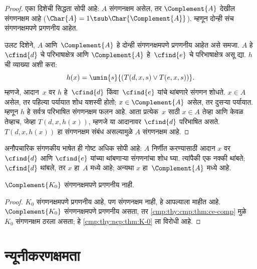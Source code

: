\begin{proof}
एका दिशेची सिद्धता सोपी आहे: $A$ संगणनक्षम असेल, तर
$\Complement{A}$ देखील संगणनक्षम आहे ($\Char{A} = 1 \tsub
\Char{\Complement{A}}$). म्हणून दोन्ही संच संगणनक्षमपणे प्रगणनीय आहेत.

उलट दिशेने, $A$ आणि~$\Complement{A}$ हे दोन्ही संगणनक्षमपणे
प्रगणनीय आहेत असे समजा. $A$ हे~$\cfind{d}$ चे परिभाषाक्षेत्र
आणि $\Complement{A}$ हे~$\cfind{e}$ चे परिभाषाक्षेत्र असू द्या.
$h$ ची व्याख्या अशी करा:
\[h(x) = \umin{s}{(T(d,x,s) \lor T(e,x,s))}.
\]
म्हणजे, आदान~$x$ वर $h$ हे~$\cfind{d}$ किंवा~$\cfind{e}$
यांचे थांबणारे संगणन शोधते. $x \in A$ असेल, तर पहिल्या
पर्यायात शोध यशस्वी होतो; $x \in
\Complement{A}$ असेल, तर दुसऱ्या पर्यायात. म्हणून $h$
हे सर्वत्र परिभाषित संगणनक्षम फलन आहे. आता प्रत्येक~$x$
साठी $x \in A$ तेव्हा आणि केवळ तेव्हाच, जेव्हा $T(d, x, h(x))$, म्हणजे
या आदानावर $\cfind{d}$ परिभाषित असते. $T(d, x, h(x))$
हा संगणनक्षम संबंध असल्यामुळे $A$ संगणनक्षम आहे.

\end{proof}

\begin{explain}
अनौपचारिक संगणकीय भाषेत ही गोष्ट अधिक सोपी आहे: $A$
निर्णीत करण्यासाठी आदान $x$ वर $\cfind{d}$ आणि $\cfind{e}$
यांच्या थांबणाऱ्या संगणनांचा शोध घ्या. त्यांपैकी एक नक्की थांबते;
$\cfind{d}$ थांबले, तर $x$ हा~$A$ मध्ये आहे; अन्यथा $x$
हा~$\Complement{A}$ मध्ये आहे.
\end{explain}

\begin{cor}
\label{cmp:thy:cmp:cor:comp-k}
$\Complement{K_0}$ संगणनक्षमपणे प्रगणनीय नाही.
\end{cor}

\begin{proof}
$K_0$ संगणनक्षमपणे प्रगणनीय आहे, पण संगणनक्षम नाही, हे
आपल्याला माहीत आहे. $\Complement{K_0}$ संगणनक्षमपणे प्रगणनीय
असता, तर \ref{cmp:thy:cmp:thm:ce-comp} मुळे $K_0$ संगणनक्षम ठरला असता;
हे \ref{cmp:thy:ncp:thm:K-0} ला विरोधी आहे.
\end{proof}











\section{न्यूनीकरणक्षमता}\label{cmp:thy:red:sec}

